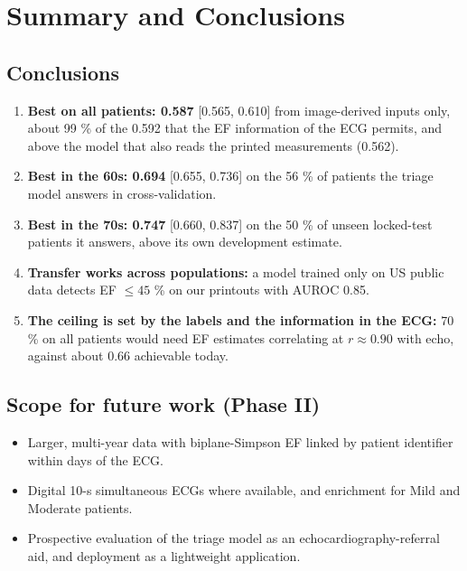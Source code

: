 \chapter{Summary and Conclusions}\label{ch:7}

\section{Conclusions}\label{sec:7.1}

\begin{enumerate}
  \item \textbf{Best on all patients: 0.587} [0.565, 0.610] from image-derived inputs only, about 99 \% of the 0.592 that the EF information of the ECG permits, and above the model that also reads the printed measurements (0.562).
  \item \textbf{Best in the 60s: 0.694} [0.655, 0.736] on the 56 \% of patients the triage model answers in cross-validation.
  \item \textbf{Best in the 70s: 0.747} [0.660, 0.837] on the 50 \% of unseen locked-test patients it answers, above its own development estimate.
  \item \textbf{Transfer works across populations:} a model trained only on US public data detects EF $\le45$ \% on our printouts with AUROC 0.85.
  \item \textbf{The ceiling is set by the labels and the information in the ECG:} 70 \% on all patients would need EF estimates correlating at $r\approx0.90$ with echo, against about 0.66 achievable today.
\end{enumerate}
\section{Scope for future work (Phase II)}\label{sec:7.2}

\begin{itemize}
  \item Larger, multi-year data with biplane-Simpson EF linked by patient identifier within days of the ECG.
  \item Digital 10-s simultaneous ECGs where available, and enrichment for Mild and Moderate patients.
  \item Prospective evaluation of the triage model as an echocardiography-referral aid, and deployment as a lightweight application.
\end{itemize}
